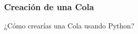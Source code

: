 \documentclass[11pt]{beamer}
\begin{document}
\begin{frame}\frametitle{Creación de una Cola}
\begin{block}{}
\centering\Huge ¿Cómo crearías una Cola usando Python?
\end{block}
\end{frame}


%
%
%
%
\end{document}
